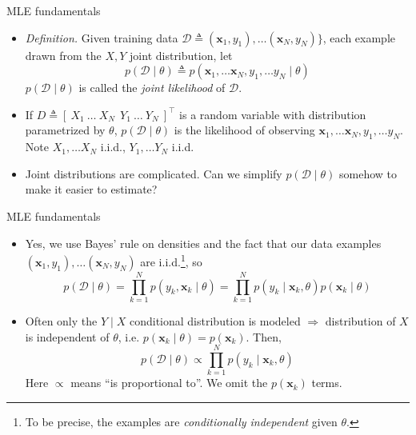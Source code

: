 \documentclass{beamer}
\numberwithin{equation}{section}
\begin{document}
\begin{frame}{MLE fundamentals}
    \begin{itemize}
        \item
        \textit{Definition.} Given training data $ \mathcal{D} \triangleq
        (\mathbf{x}_1, y_1), \ldots (\mathbf{x}_N, y_N)\} $, each example
        drawn from the $ X, Y $ joint distribution, let
        \begin{equation*}
            p(\mathcal{D} \mid \theta) \triangleq p(\mathbf{x}_1, \ldots
                \mathbf{x}_N, y_1, \ldots y_N \mid \theta)
        \end{equation*}
        $ p(\mathcal{D} \mid \theta) $ is called the
        \textit{joint likelihood} of $ \mathcal{D} $.

        \item
        If $ D \triangleq [ \ X_1 \ \ldots \ X_N \ \ Y_1 \ \ldots
        \ Y_N \ ]^\top $ is a random variable with distribution
        parametrized by $ \theta $, $ p(\mathcal{D} \mid \theta) $ is the
        likelihood of observing $ \mathbf{x}_1, \ldots \mathbf{x}_N, y_1,
        \ldots y_N $. Note $ X_1, \ldots X_N $ i.i.d.,
        $ Y_1, \ldots Y_N $ i.i.d.

        \item
        Joint distributions are complicated. Can we simplify
        $ p(\mathcal{D} \mid \theta) $ somehow to make it easier to estimate?
    \end{itemize}
\end{frame}

\begin{frame}{MLE fundamentals}
    \begin{itemize}
        \item
        Yes, we use Bayes' rule on densities and the fact that our data
        examples $ (\mathbf{x}_1, y_1), \ldots (\mathbf{x}_N, y_N) $ are
        i.i.d.\footnote{
            To be precise, the examples are \textit{conditionally independent}
            given $ \theta $.
        }, so
        \begin{equation*}
            p(\mathcal{D} \mid \theta) =
            \prod_{k = 1}^N p(y_k, \mathbf{x}_k \mid \theta) =
            \prod_{k = 1}^N p(y_k \mid \mathbf{x}_k, \theta)
                p(\mathbf{x}_k \mid \theta)
        \end{equation*}

        \item
        Often only the $ Y \mid X $ conditional distribution is modeled
        $ \Rightarrow $ distribution of $ X $ is independent of $ \theta $,
        i.e. $ p(\mathbf{x}_k \mid \theta) = p(\mathbf{x}_k) $. Then,
        \begin{equation} \label{cond_likelihood}
            p(\mathcal{D} \mid \theta) \propto
            \prod_{k = 1}^N p(y_k \mid \mathbf{x}_k, \theta)
        \end{equation}
        Here $ \propto $ means ``is proportional to''. We omit the
        $ p(\mathbf{x}_k) $ terms.
    \end{itemize}
\end{frame}
\end{document}
